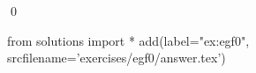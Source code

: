 
\begin{ex} 
  \label{ex:egf0}
  
  \qed
\end{ex} 
\begin{python0}
from solutions import *
add(label="ex:egf0",
    srcfilename='exercises/egf0/answer.tex') 
\end{python0}

